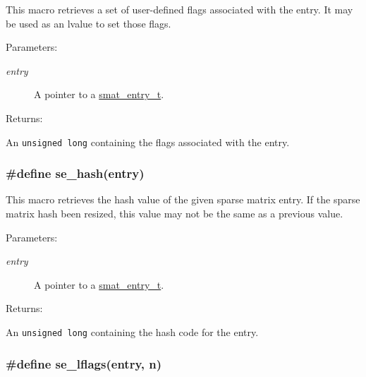 This macro retrieves a set of user-defined flags associated with the entry. It may be used as an lvalue to set those flags.\begin{Desc}
\item[Parameters: ]\par
\begin{description}
\item[{\em 
entry}]A pointer to a \hyperlink{group__dbprim__smat_a2}{smat\_\-entry\_\-t}.\end{description}
\end{Desc}
\begin{Desc}
\item[Returns: ]\par
An {\tt unsigned long} containing the flags associated with the entry. \end{Desc}
\hypertarget{group__dbprim__smat_a43}{
\subsubsection[se\_\-hash]{\setlength{\rightskip}{0pt plus 5cm}\#define se\_\-hash(entry)}}
\label{group__dbprim__smat_a43}


This macro retrieves the hash value of the given sparse matrix entry. If the sparse matrix hash been resized, this value may not be the same as a previous value.\begin{Desc}
\item[Parameters: ]\par
\begin{description}
\item[{\em 
entry}]A pointer to a \hyperlink{group__dbprim__smat_a2}{smat\_\-entry\_\-t}.\end{description}
\end{Desc}
\begin{Desc}
\item[Returns: ]\par
An {\tt unsigned long} containing the hash code for the entry. \end{Desc}
\hypertarget{group__dbprim__smat_a46}{
\subsubsection[se\_\-lflags]{\setlength{\rightskip}{0pt plus 5cm}\#define se\_\-lflags(entry, n)}}
\label{group__dbprim__smat_a46}


